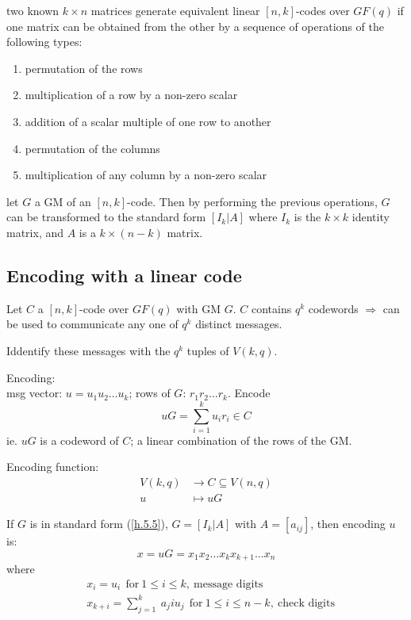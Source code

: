 \documentclass{article}
\theoremstyle{definition}
\newenvironment{thm}[1]
{\renewcommand\theinnerthm{#1}\innerthm}
{\endinnerthm}
\newcommand{\Vnq}{V(n, q)}
\begin{document}
\begin{thm}{5.4}
  two known $k \times n$ matrices generate equivalent linear $[n,k]$-codes over $GF(q)$ if one matrix can be obtained from the other by a sequence of operations of the following types:
  \begin{enumerate}
    \item[R1.] permutation of the rows
    \item[R2.] multiplication of a row by a non-zero scalar
    \item[R3.] addition of a scalar multiple of one row to another
    \item[C1.] permutation of the columns
    \item[C2.] multiplication of any column by a non-zero scalar
  \end{enumerate}
\end{thm}

\begin{thm}{5.5} \label{h.5.5}
  let $G$ a GM of an $[n, k]$-code. Then by performing the previous operations, $G$ can be transformed to the standard form $[ I_k | A ]$
  where $I_k$ is the $k \times k$ identity matrix, and $A$ is a $k \times (n-k)$ matrix.
\end{thm}

\subsection{Encoding with a linear code}
Let $C$ a $[n,k]$-code over $GF(q)$ with GM $G$. $C$ contains $q^k$ codewords $\Longrightarrow$ can be used to communicate any one of $q^k$ distinct messages.

Iddentify these messages with the $q^k$ tuples of $V(k,q)$.

Encoding:\\
msg vector: $u=u_1 u_2 \ldots u_k$; rows of $G$: $r_1 r_2 \ldots r_k$. Encode
$$uG = \sum^k_{i=1} u_i r_i \in C$$
ie. $uG$ is a codeword of $C$; a linear combination of the rows of the GM.

Encoding function:
\begin{align*}
  V(k,q) &\longrightarrow C \subseteq \Vnq\\
  u &\longmapsto uG
\end{align*}

If $G$ is in standard form (\ref{h.5.5}), $G= [I_k | A]$ with $A=[a_{ij}]$, then encoding $u$ is:
$$x=uG = x_1x_2 \ldots x_k x_{k+1} \ldots x_n$$
where
\begin{align*}
  &x_i=u_i ~~\text{for}~ 1 \leq i \leq k, ~\text{message digits}\\
  &x_{k+i}=\sum^k_{j=1}~ a_ji u_j ~~\text{for}~ 1 \leq i \leq n-k, ~\text{check digits}\\
\end{align*}
\end{document}
